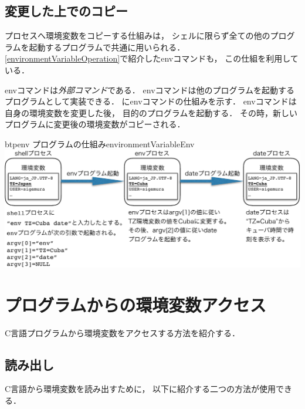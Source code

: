 \subsection{変更した上でのコピー}
プロセスへ環境変数をコピーする仕組みは，
シェルに限らず全ての他のプログラムを起動するプログラムで共通に用いられる．
\ref{environmentVariableOperation}で紹介したenvコマンドも，
この仕組を利用している．

envコマンドは\emph{外部コマンド}である．
envコマンドは他のプログラムを起動するプログラムとして実装できる．
にenvコマンドの仕組みを示す．
envコマンドは自身の環境変数を変更した後，
目的のプログラムを起動する．
その時，新しいプログラムに変更後の環境変数がコピーされる．

\begin{myfig}{btp}{env プログラムの仕組み}{environmentVariableEnv}
  \includegraphics[scale=0.8]{Fig/environmentVariableEnv-crop.pdf}
\end{myfig}

\section{プログラムからの環境変数アクセス}
C言語プログラムから環境変数をアクセスする方法を紹介する．

\subsection{読み出し}
C言語から環境変数を読み出すために，
以下に紹介する二つの方法が使用できる．

